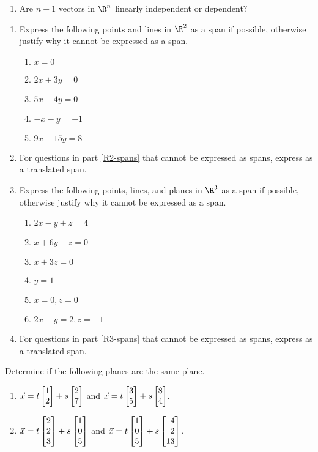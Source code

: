 \begin{exercises}
\begin{problist}
\begin{enumerate}
			\item Are $n+1$ vectors in $\R^n$ linearly independent or dependent?
		\end{enumerate}
		\prob
		\begin{enumerate}
			\item
			Express the following points and lines in $\R^2$ as a span if possible, otherwise
			justify why it cannot be expressed as a span.
			\label{R2-spans}
			\begin{enumerate}
				\item $x=0$
				\item $2x+3y=0$
				\item $5x-4y=0$
				\item $-x-y=-1$
				\item $9x-15y=8$
			\end{enumerate}
			\item
			For questions in part \ref{R2-spans} that cannot be expressed as spans, express
			as a translated span.
			\item
			Express the following points, lines, and planes in $\R^3$ as a span if possible,
			otherwise justify why it cannot be expressed as a span.
			\label{R3-spans}
			\begin{enumerate}
				\item $2x-y+z=4$
				\item	$x+6y-z=0$
				\item $x+3z=0$
				\item $y=1$
				\item $x=0, z=0$
				\item $2x-y=2,z=-1$
			\end{enumerate}
			\item
			For questions in part \ref{R3-spans} that cannot be expressed as spans, express
			as a translated span.
		\end{enumerate}
		\prob
		Determine if the following planes are the same plane.
		\begin{enumerate}
			\item $\vec x = t\mat{1\\2} + s\mat{2\\7}$ and
						$\vec x = t\mat{3\\5} + s\mat{8\\4}$.
			\item $\vec x = t\mat{2\\2\\3} + s\mat{1\\0\\5}$ and
						$\vec x = t\mat{1\\0\\5} + s\mat{4\\2\\13}$.

\end{enumerate}
\end{problist}
\end{exercises}
